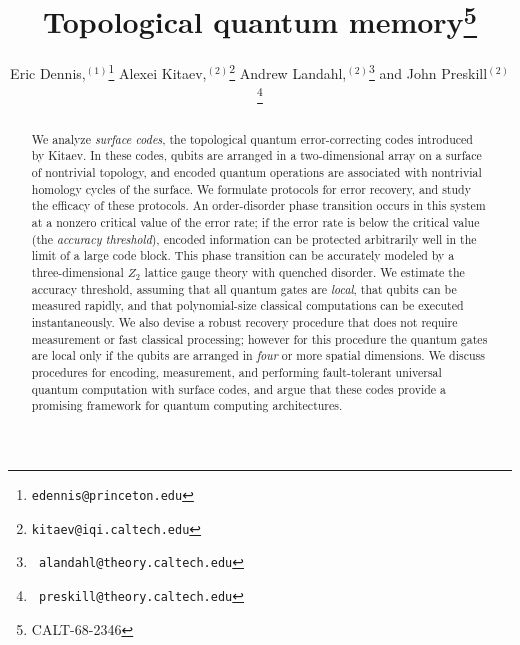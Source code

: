 

\def\lsim{\mathrel{\raise.3ex\hbox{$<$\kern-.75em\lower1ex\hbox{$\sim$}}}}
\def\gsim{\mathrel{\raise.3ex\hbox{$>$\kern-.75em\lower1ex\hbox{$\sim$}}}}
\newcommand{\ket}[1]{|{#1}\rangle}

\title{Topological quantum memory\thanks{CALT-68-2346}}
\author{Eric Dennis,$^{(1)}$\thanks{\tt edennis@princeton.edu} Alexei
Kitaev,$^{(2)}$\thanks{\tt kitaev@iqi.caltech.edu} Andrew Landahl,$^{(2)}$\thanks{\tt
alandahl@theory.caltech.edu} and John Preskill$^{(2)}$\thanks{\tt
preskill@theory.caltech.edu}}

\address{$^{(1)}$Princeton University, Princeton, NJ 08544, USA\\
$^{(2)}$Institute for Quantum Information, California Institute of Technology, 
Pasadena, CA 91125, USA }



\maketitle

\begin{abstract}
We analyze {\em surface codes}, the topological quantum error-correcting codes introduced 
by Kitaev. In these codes, qubits are arranged in a two-dimensional array on a surface of nontrivial topology, and encoded quantum operations are associated with nontrivial homology cycles of the surface. We formulate protocols for error recovery, and study the efficacy of these protocols. An order-disorder phase transition occurs in this system at a nonzero critical value of the error rate; if the error rate is below the critical value (the {\em accuracy threshold}), encoded information can be protected arbitrarily well in the limit of a large code block. This phase transition can be accurately modeled by a three-dimensional $Z_2$ lattice gauge theory with quenched disorder. We estimate the accuracy threshold, assuming that all quantum gates are {\em local}, that qubits can be measured rapidly, and that polynomial-size classical computations can be executed instantaneously. We also devise a robust recovery procedure that does not require measurement or fast classical processing; however for this procedure the quantum gates are local only if the qubits are arranged in {\em four} or more spatial dimensions. We discuss procedures for encoding, measurement, and performing fault-tolerant universal quantum computation with surface codes, and argue that these codes provide a promising framework for quantum computing architectures.
\end{abstract}

